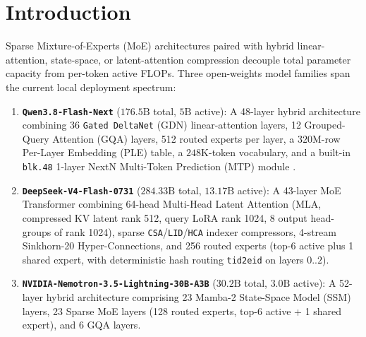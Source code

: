 \documentclass[10pt,twocolumn]{article}
\begin{document}
\section{Introduction}

Sparse Mixture-of-Experts (MoE) architectures paired with hybrid linear-attention, state-space, or latent-attention compression decouple total parameter capacity from per-token active FLOPs. Three open-weights model families span the current local deployment spectrum:
\begin{enumerate}
    \item \textbf{\texttt{Qwen3.8-Flash-Next}} \cite{qwen38} ($176.5\text{B}$ total, $5\text{B}$ active): A 48-layer hybrid architecture combining 36 \texttt{Gated DeltaNet} (GDN) linear-attention layers, 12 Grouped-Query Attention (GQA) layers, 512 routed experts per layer, a $320\text{M}$-row Per-Layer Embedding (PLE) table, a $248\text{K}$-token vocabulary, and a built-in \texttt{blk.48} 1-layer NextN Multi-Token Prediction (MTP) module \cite{gloeckle2024mtp}.
    \item \textbf{\texttt{DeepSeek-V4-Flash-0731}} \cite{deepseekv4,deepseekv3} ($284.33\text{B}$ total, $13.17\text{B}$ active): A 43-layer MoE Transformer combining 64-head Multi-Head Latent Attention (MLA, compressed KV latent rank 512, query LoRA rank 1024, 8 output head-groups of rank 1024), sparse \texttt{CSA}/\texttt{LID}/\texttt{HCA} indexer compressors, 4-stream Sinkhorn-20 Hyper-Connections, and 256 routed experts (top-6 active plus 1 shared expert, with deterministic hash routing \texttt{tid2eid} on layers $0..2$).
    \item \textbf{\texttt{NVIDIA-Nemotron-3.5-Lightning-30B-A3B}} \cite{nemotron35,nemotron2025} ($30.2\text{B}$ total, $3.0\text{B}$ active): A 52-layer hybrid architecture comprising 23 Mamba-2 State-Space Model (SSM) layers, 23 Sparse MoE layers (128 routed experts, top-6 active + 1 shared expert), and 6 GQA layers.
\end{enumerate}
\end{document}
